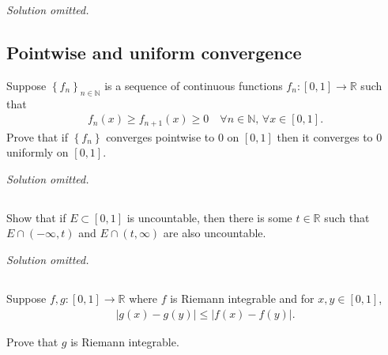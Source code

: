 \emph{Solution omitted.}

\hypertarget{pointwise-and-uniform-convergence}{%
\subsection{Pointwise and uniform
convergence}\label{pointwise-and-uniform-convergence}}

\begin{problem}[?]

Suppose \(\left\{{f_n}\right\}_{n\in {\mathbb{N}}}\) is a sequence of
continuous functions \(f_n: [0, 1]\to {\mathbb{R}}\) such that
\begin{align*}  
f_n(x) \geq f_{n+1}(x) \geq 0 \quad \forall n\in {\mathbb{N}},\, \forall x\in [0, 1]
.\end{align*}
Prove that if \(\left\{{f_n}\right\}\) converges pointwise to \(0\) on
\([0, 1]\) then it converges to \(0\) uniformly on \([0, 1]\).

\end{problem}

\emph{Solution omitted.}

\hypertarget{section}{%
\subsection{}\label{section}}

\begin{problem}[?]

Show that if \(E\subset [0, 1]\) is uncountable, then there is some
\(t\in {\mathbb{R}}\) such that \(E\cap(-\infty ,t)\) and
\(E\cap(t, \infty)\) are also uncountable.

\end{problem}

\emph{Solution omitted.}

\hypertarget{section-1}{%
\subsection{}\label{section-1}}

\begin{problem}[?]

Suppose \(f, g: [0, 1] \to {\mathbb{R}}\) where \(f\) is Riemann
integrable and for \(x, y\in [0, 1]\),
\begin{align*}
{\left\lvert {g(x) - g(y)} \right\rvert} \leq {\left\lvert {f(x) - f(y)} \right\rvert}
.\end{align*}

Prove that \(g\) is Riemann integrable.

\end{problem}

